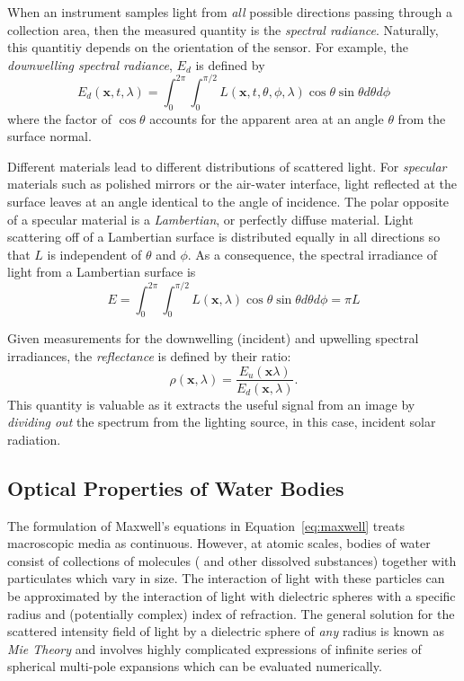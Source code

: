 When an instrument samples light from \textit{all} possible directions passing
through a collection area, then the
measured quantity is the \textit{spectral radiance}. Naturally, this quantitiy
depends on the orientation of the sensor. For example, the \textit{downwelling
  spectral radiance}, $E_d$ is defined by
\begin{equation}
  E_d(\mathbf{x}, t, \lambda) = \int_0^{2\pi} \int_0^{\pi/2}L(\mathbf{x}, t, \theta, \phi, \lambda)\cos\theta \sin\theta d\theta d\phi
\end{equation}
where the factor of $\cos\theta$ accounts for the apparent area at an angle
$\theta$ from the surface normal.

Different materials lead to different distributions of scattered light. For
\textit{specular} materials such as polished mirrors or the air-water interface, light
reflected at the surface leaves at an angle identical to the angle of incidence.
The polar opposite of a specular material is a \textit{Lambertian}, or perfectly
diffuse material. Light scattering off of a Lambertian surface is distributed
equally in all directions so that $L$ is independent of $\theta$ and $\phi$. As
a consequence, the spectral irradiance of light from a Lambertian surface is
\begin{equation}
  E = \int_0^{2\pi}\int_0^{\pi/2} L(\mathbf{x}, \lambda)\cos\theta \sin\theta d\theta d\phi = \pi L
\end{equation}

Given measurements for the downwelling (incident) and upwelling spectral
irradiances, the \textit{reflectance} is defined by their ratio:
\begin{equation}
  \rho(\mathbf{x},\lambda) = \dfrac{E_u(\mathbf{x}\lambda)}{E_d(\mathbf{x}, \lambda)}.
\end{equation}
This quantity is valuable as it extracts the useful signal from an image by
\textit{dividing out} the spectrum from the lighting source, in this case,
incident solar radiation.

\subsection{Optical Properties of Water Bodies}

The formulation of Maxwell's equations in Equation~\ref{eq:maxwell} treats
macroscopic media as continuous. However, at atomic scales, bodies of water
consist of collections of molecules ( and other dissolved substances)
together with particulates which vary in size. The interaction of light with
these particles can be approximated by the interaction of light with dielectric
spheres with a specific radius and (potentially complex) index of refraction.
The general solution for the scattered intensity field of light by a dielectric
sphere of \textit{any} radius is known as \textit{Mie Theory} and involves
highly complicated expressions of infinite series of spherical multi-pole
expansions which can be evaluated numerically.

